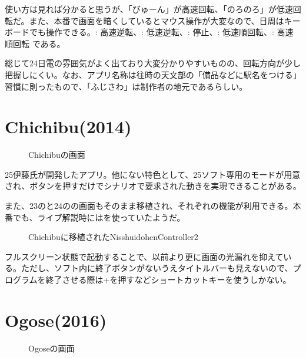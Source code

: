 \documentclass[letterpaper,10pt,dvipdfmx]{sphinxmanual}
\begin{document}
使い方は見れば分かると思うが、「びゅーん」が高速回転、「のろのろ」が低速回転だ。また、本番で画面を暗くしているとマウス操作が大変なので、日周はキーボードでも操作できる。:
高速逆転、: 低速逆転、: 停止、:
低速順回転、: 高速順回転 である。

総じて24日電の雰囲気がよく出ており大変分かりやすいものの、回転方向が少し把握しにくい。なお、アプリ名称は往時の天文部の「備品などに駅名をつける」習慣に則ったもので、「ふじさわ」は制作者の地元であるらしい。


\section{Chichibu(2014)}
\label{\detokenize{nissyu-idohen/pc-software-history:chichibu-2014}}\begin{figure}[htbp]
\centering
\capstart

\noindent{}
\caption{Chichibuの画面}\label{\detokenize{nissyu-idohen/pc-software-history:id6}}\end{figure}

25伊藤氏が開発したアプリ。他にない特色として、25ソフト専用のモードが用意され、ボタンを押すだけでシナリオで要求された動きを実現できることがある。

また、23のと24のの画面もそのまま移植され、それぞれの機能が利用できる。本番でも、ライブ解説時にはを使っていたようだ。
\begin{figure}[htbp]
\centering
\capstart

\noindent{}
\caption{Chichibuに移植されたNisshuidohenController2}\label{\detokenize{nissyu-idohen/pc-software-history:id7}}\end{figure}

フルスクリーン状態で起動することで、以前より更に画面の光漏れを抑えている。ただし、ソフト内に終了ボタンがないうえタイトルバーも見えないので、プログラムを終了させる際は+を押すなどショートカットキーを使うしかない。


\section{Ogose(2016)}
\label{\detokenize{nissyu-idohen/pc-software-history:ogose-2016}}\begin{figure}[htbp]
\centering
\capstart

\noindent{}
\caption{Ogoseの画面}\label{\detokenize{nissyu-idohen/pc-software-history:id8}}\end{figure}
\end{document}
